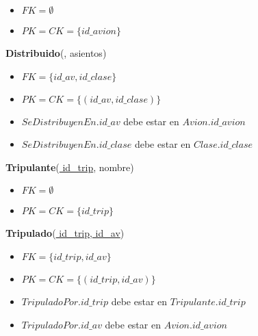 \begin{itemize}[noitemsep]
	\item $FK = \emptyset$
	\item $PK = CK = \{id\_avion\}$
\end{itemize}


\vspace*{0.1cm}
\noindent
\textbf{Distribuido}(\underline{},
	asientos)

\begin{itemize}[noitemsep]
	\item $FK = \{id\_av, id\_clase\}$
	\item $PK = CK = \{(id\_av, id\_clase)\}$
	\item $SeDistribuyenEn.id\_av$ debe estar en $Avion.id\_avion$
	\item $SeDistribuyenEn.id\_clase$ debe estar en $Clase.id\_clase$
\end{itemize}


\vspace*{0.1cm}
\noindent
\textbf{Tripulante}(\underline{
	id\_trip}, 
	nombre)

\begin{itemize}[noitemsep]
	\item $FK = \emptyset$
	\item $PK = CK = \{id\_trip\}$
\end{itemize}


\vspace*{0.1cm}
\noindent
\textbf{Tripulado}(\underline{
	id\_trip, 
	id\_av})

\begin{itemize}[noitemsep]
	\item $FK = \{id\_trip, id\_av\}$
	\item $PK = CK = \{(id\_trip, id\_av)\}$
	\item $TripuladoPor.id\_trip$ debe estar en
		$Tripulante.id\_trip$
	\item $TripuladoPor.id\_av$ debe estar en $Avion.id\_avion$
\end{itemize}

